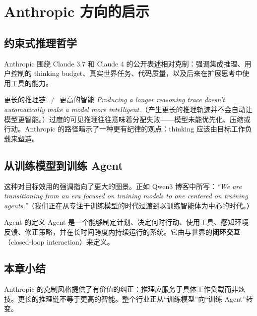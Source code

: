 \section{Anthropic 方向的启示}

\subsection{约束式推理哲学}

Anthropic 围绕 Claude 3.7 和 Claude 4 的公开表述相对克制：强调集成推理、用户控制的 thinking budget、真实世界任务、代码质量，以及后来在扩展思考中使用工具的能力。

\begin{importantbox}{更长的推理链 $\neq$ 更高的智能}
\textit{Producing a longer reasoning trace doesn't automatically make a model more intelligent.}（产生更长的推理轨迹并不会自动让模型更智能。）过度的可见推理往往意味着分配失败——模型未能优先化、压缩或行动。Anthropic 的路径暗示了一种更有纪律的观点：thinking 应该由目标工作负载来塑造。
\end{importantbox}

\subsection{从训练模型到训练 Agent}

这种对目标效用的强调指向了更大的图景。正如 Qwen3 博客中所写：\textit{``We are transitioning from an era focused on training models to one centered on training agents.''}（我们正在从专注于训练模型的时代过渡到以训练智能体为中心的时代。）

\begin{knowledgebox}{Agent 的定义}
Agent 是一个能够制定计划、决定何时行动、使用工具、感知环境反馈、修正策略，并在长时间跨度内持续运行的系统。它由与世界的\textbf{闭环交互}（closed-loop interaction）来定义。
\end{knowledgebox}

\subsection{本章小结}

Anthropic 的克制风格提供了有价值的纠正：推理应服务于具体工作负载而非炫技。更长的推理链不等于更高的智能。整个行业正从``训练模型''向``训练 Agent''转变。


